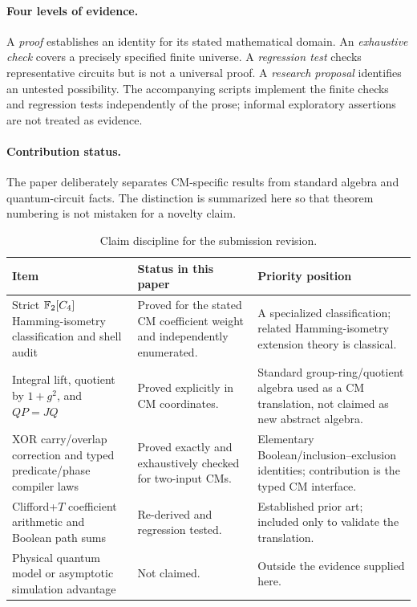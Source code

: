 \paragraph{Four levels of evidence.}
A \emph{proof} establishes an identity for its stated mathematical domain. An \emph{exhaustive check} covers a precisely specified finite universe. A \emph{regression test} checks representative circuits but is not a universal proof. A \emph{research proposal} identifies an untested possibility. The accompanying scripts implement the finite checks and regression tests independently of the prose; informal exploratory assertions are not treated as evidence.

\paragraph{Contribution status.}
The paper deliberately separates CM-specific results from standard algebra and quantum-circuit facts.  The distinction is summarized here so that theorem numbering is not mistaken for a novelty claim.
\begin{table}[htbp]
\centering\small
\begin{tabularx}{\textwidth}{@{}L{0.30\textwidth}Y L{0.25\textwidth}@{}}
\toprule
Item & Status in this paper & Priority position\\
\midrule
Strict $\mathbb F_2[C_4]$ Hamming-isometry classification and shell audit & Proved for the stated CM coefficient weight and independently enumerated. & A specialized classification; related Hamming-isometry extension theory is classical.\\
Integral lift, quotient by $1+g^2$, and $QP=JQ$ & Proved explicitly in CM coordinates. & Standard group-ring/quotient algebra used as a CM translation, not claimed as new abstract algebra.\\
XOR carry/overlap correction and typed predicate/phase compiler laws & Proved exactly and exhaustively checked for two-input CMs. & Elementary Boolean/inclusion--exclusion identities; contribution is the typed CM interface.\\
Clifford+$T$ coefficient arithmetic and Boolean path sums & Re-derived and regression tested. & Established prior art; included only to validate the translation.\\
Physical quantum model or asymptotic simulation advantage & Not claimed. & Outside the evidence supplied here.\\
\bottomrule
\end{tabularx}
\caption{Claim discipline for the submission revision.}
\label{tab:claimstatus}
\end{table}


